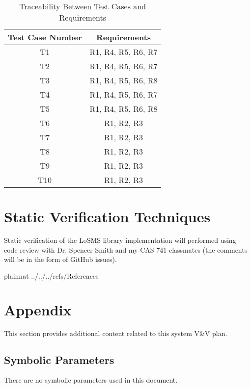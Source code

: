 \documentclass[12pt, titlepage]{article}
\newcommand{\famname}{LoSMS} %
\begin{document}
\begin{table} [h!]
	\centering
	\begin{tabular}{|c|c|}
		\hline	
		\textbf{Test Case Number} & \textbf{Requirements}\\
		\hline 
		T1& R1, R4, R5, R6, R7\\ \hline
		T2& R1, R4, R5, R6, R7\\ \hline
		T3& R1, R4, R5, R6, R8\\ \hline
		T4& R1, R4, R5, R6, R7\\ \hline
		T5& R1, R4, R5, R6, R8\\ \hline
		T6& R1, R2, R3\\ \hline
		T7& R1, R2, R3\\ \hline
		T8& R1, R2, R3\\ \hline
		T9& R1, R2, R3\\ \hline
		T10& R1, R2, R3\\ \hline
	\end{tabular}
	\caption{Traceability Between Test Cases and Requirements}
	\label{Table:Traceability} 
\end{table}

\FloatBarrier

\section{Static Verification Techniques} \label{StaticVerTechniques}

Static verification of the \famname{} library implementation will performed 
using code review with Dr. Spencer Smith and my CAS 741 classmates (the 
comments will be in the form of GitHub issues).

\newpage
				
 {plainnat}
 {../../../refs/References}

\newpage

\section{Appendix}

This section provides additional content related to this system V\&V plan.

\subsection{Symbolic Parameters}

There are no symbolic parameters used in this document.
\end{document}
